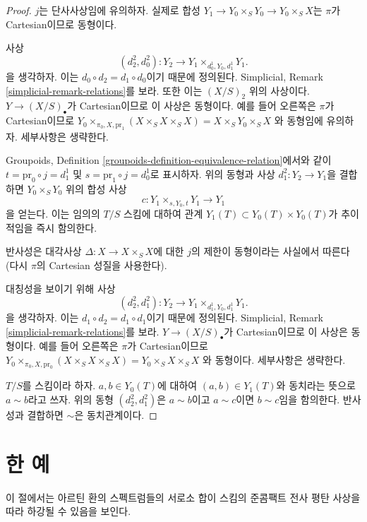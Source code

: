 \begin{proof}
$j$는 단사사상임에 유의하자. 실제로 합성
$Y_1 \to Y_0 \times_S Y_0 \to Y_0 \times_S X$는
$\pi$가 Cartesian이므로 동형이다.

\medskip\noindent
사상
$$
(d^2_2, d^2_0) : Y_2 \to Y_1 \times_{d^1_0, Y_0, d^1_1} Y_1.
$$
을 생각하자. 이는 $d_0 \circ d_2 = d_1 \circ d_0$이기 때문에
정의된다. Simplicial, Remark \ref{simplicial-remark-relations}를 보라.
또한 이는 $(X/S)_2$ 위의 사상이다. $Y \to (X/S)_\bullet$가
Cartesian이므로 이 사상은 동형이다. 예를 들어 오른쪽은 $\pi$가
Cartesian이므로
$Y_0 \times_{\pi_0, X, \text{pr}_1} (X \times_S X \times_S X) =
X \times_S Y_0 \times_S X$
와 동형임에 유의하자. 세부사항은 생략한다.

\medskip\noindent
Groupoids, Definition \ref{groupoids-definition-equivalence-relation}에서와
같이 $t = \text{pr}_0 \circ j = d^1_1$ 및
$s = \text{pr}_1 \circ j = d^1_0$로 표시하자.
위의 동형과 사상 $d^2_1 : Y_2 \to Y_1$을 결합하면
$Y_0 \times_S Y_0$ 위의 합성 사상
$$
c : Y_1 \times_{s, Y_0, t} Y_1 \longrightarrow Y_1
$$
을 얻는다. 이는 임의의 $T/S$ 스킴에 대하여 관계
$Y_1(T) \subset Y_0(T) \times Y_0(T)$가 추이적임을 즉시 함의한다.

\medskip\noindent
반사성은 대각사상 $\Delta : X \to X \times_S X$에 대한
$j$의 제한이 동형이라는 사실에서 따른다
(다시 $\pi$의 Cartesian 성질을 사용한다).

\medskip\noindent
대칭성을 보이기 위해 사상
$$
(d^2_2, d^2_1) : Y_2 \to Y_1 \times_{d^1_1, Y_0, d^1_1} Y_1.
$$
을 생각하자. 이는 $d_1 \circ d_2 = d_1 \circ d_1$이기 때문에
정의된다. Simplicial, Remark \ref{simplicial-remark-relations}를 보라.
$Y \to (X/S)_\bullet$가 Cartesian이므로 이 사상은 동형이다.
예를 들어 오른쪽은 $\pi$가 Cartesian이므로
$Y_0 \times_{\pi_0, X, \text{pr}_0} (X \times_S X \times_S X) =
Y_0 \times_S X \times_S X$
와 동형이다. 세부사항은 생략한다.

\medskip\noindent
$T/S$를 스킴이라 하자. $a, b \in Y_0(T)$에 대하여
$(a,b) \in Y_1(T)$와 동치라는 뜻으로 $a \sim b$라고 쓰자.
위의 동형 $(d^2_2, d^2_1)$은 $a \sim b$이고 $a \sim c$이면
$b \sim c$임을 함의한다. 반사성과 결합하면 $\sim$은 동치관계이다.
\end{proof}

\section{한 예}
\label{section-example}

\noindent
이 절에서는 아르틴 환의 스펙트럼들의 서로소 합이
스킴의 준콤팩트 전사 평탄 사상을 따라 하강될 수 있음을 보인다.

